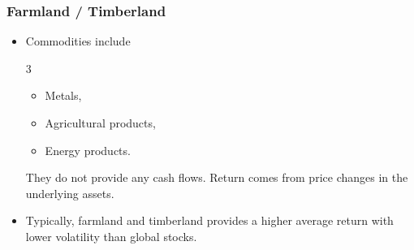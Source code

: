 \documentclass[../notes_compiled.tex]{subfiles}
\begin{document}
\subsubsection{Farmland / Timberland}
\begin{itemize}
\item Commodities include
\begin{multicols}{3}
\begin{itemize}
\item Metals,
\item Agricultural products,
\item Energy products.
\end{itemize}
\end{multicols}
They do not provide any cash flows. Return comes from price changes in the underlying assets.
\item Typically, farmland and timberland provides a higher average return with lower volatility than global stocks.
\end{itemize}
\end{document}
